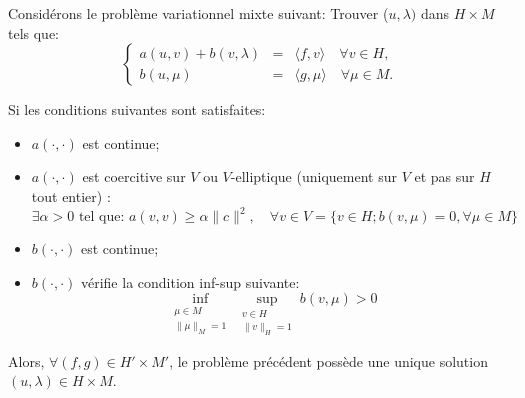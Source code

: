 \label{Sec:Brezzi}

\medskip
\begin{theoreme}
Considérons le problème variationnel mixte suivant:
Trouver ($u, \lambda)$ dans $H\times M$ tels que:
 \begin{equation}\label{Eq-PM}\left\{
\begin{array}{rcl}
 a(u,v) + b(v, \lambda) &=& \langle f,v\rangle \quad \forall v\in H,\\
b(u,\mu) &=& \langle g,\mu\rangle \quad \forall \mu \in M.
\end{array}\right.
\end{equation}

Si les conditions suivantes sont satisfaites:
\begin{itemize}
   \item $a(\cdot,\cdot)$ est continue;
   \item $a(\cdot,\cdot)$ est coercitive sur $V$ ou $V$-elliptique (uniquement sur $V$ et pas sur $H$ tout entier) :
   \begin{equation}\exists \alpha> 0 \text{ tel que: } a(v,v)\ge\alpha\|c\|^2, \quad \forall v\in V=\{v\in H; b(v,\mu)=0, \forall \mu\in M \}\end{equation}
   \item $b(\cdot,\cdot)$ est continue;
   \item $b(\cdot,\cdot)$ vérifie la condition inf-sup suivante:
\begin{equation}\inf_{\substack{\mu\in M\\\|\mu\|_M=1}} \sup_{\substack{v\in H\\\|v\|_H=1}} b(v,\mu) > 0\end{equation}
\end{itemize}
Alors, $\forall (f,g)\in H'\times M'$, le problème précédent possède une unique solution
$(u,\lambda) \in H\times M$.
\end{theoreme}

\medskip
{}


